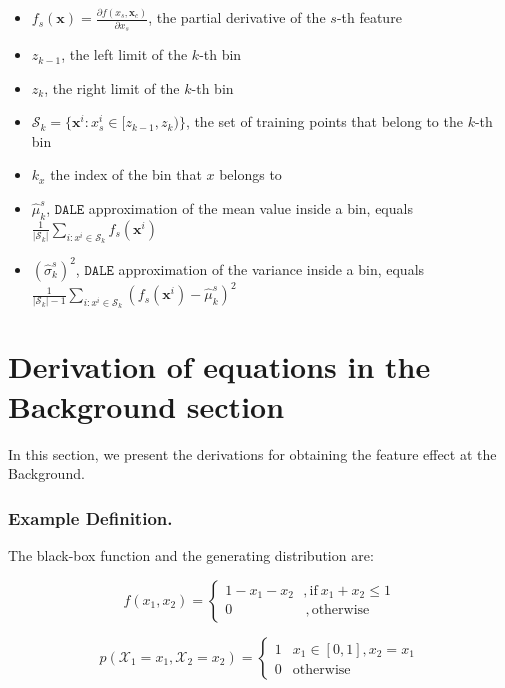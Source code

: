 \documentclass[runningheads, envcountsame, a4paper]{llncs}
\newcommand{\xc}{\mathbf{x}_c}
\newcommand{\xb}{\mathbf{x}}
\begin{document}
\begin{itemize}
\item \( f_s(\xb) = \frac{\partial f(x_s, \xc)}{\partial x_s} \), the partial derivative of the \( s \)-th feature
\item \( z_{k-1}\), the left limit of the \( k\)-th bin
\item \( z_k\), the right limit of the \( k \)-th bin
\item \( \mathcal{S}_k = \{ \xb^i : x^i_s \in [z_{k-1}, z_k) \}\), the set of training points that belong to the \( k\)-th bin
\item \( k_x \) the index of the bin that \( x \) belongs to
\item \( \hat{\mu}_k^s\), \(\mathtt{DALE}\) approximation of the mean value inside a bin, equals \( \frac{1}{|\mathcal{S}_k|} \sum_{i: x^i\in \mathcal{S}_k} f_s(\xb^i) \)
\item \( (\hat{\sigma}_k^s)^2\), \(\mathtt{DALE}\) approximation of the variance inside a bin, equals \( \frac{1}{|\mathcal{S}_k|-1} \sum_{i: x^i\in \mathcal{S}_k} (f_s(\xb^i) - \hat{\mu}_k^s)^2 \)

\end{itemize}

\section{Derivation of equations in the Background section}

In this section, we present the derivations for obtaining the feature
effect at the Background.


\subsubsection*{Example Definition.}The black-box function and the
generating distribution are:

\begin{equation}
  \label{eq:black-box}
  f(x_1, x_2) =
  \begin{cases}
    1 - x_1 - x_2 \: \: \:  ,\text{if} \: x_1 + x_2  \leq 1 \\
    0 \quad \quad \quad \quad \quad \:, \text{otherwise}
  \end{cases}
\end{equation}

\begin{equation}
  \label{eq:generative}
  p(\mathcal{X}_1 = x_1, \mathcal{X}_2=x_2) =
  \begin{cases}
    1 & x_1 \in [0,1], x_2=x_1 \\
    0 & \text{otherwise}
  \end{cases}
\end{equation}
\end{document}
